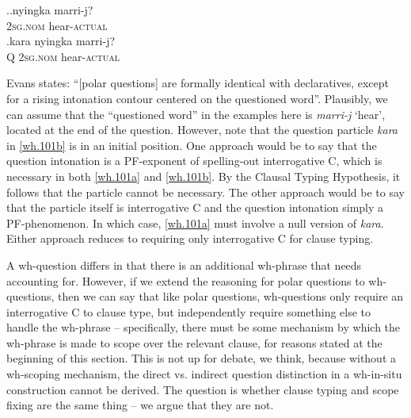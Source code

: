 \documentclass{glossa}
\begin{document}
\ex.\ag.\label{wh.101a}nyingka marri-j?\\
   \textsc{2sg.nom} hear-\textsc{actual}\\
   \bg.\label{wh.101b}kara nyingka marri-j?\\
   Q \textsc{2sg.nom} hear-\textsc{actual}\\
   \hspace{\fill}\citep[364--365]{evans:1995}

Evans states: ``[polar questions] are formally identical with declaratives, except for a rising intonation contour centered on the questioned word''. Plausibly, we can assume that the ``questioned word'' in the examples here is \textit{marri-j} `hear', located at the end of the question. However, note that the question particle \textit{kara} in \ref{wh.101b} is in an initial position. One approach would be to say that the question intonation is a PF-exponent of spelling-out interrogative C, which is necessary in both \ref{wh.101a} and \ref{wh.101b}. By the Clausal Typing Hypothesis, it follows that the particle cannot be necessary. The other approach would be to say that the particle itself is interrogative C and the question intonation simply a PF-phenomenon. In which case, \ref{wh.101a} must involve a null version of \textit{kara}. Either approach reduces to requiring only interrogative C for clause typing.

A wh-question differs in that there is an additional wh-phrase that needs accounting for. However, if we extend the reasoning for polar questions to wh-questions, then we can say that like polar questions, wh-questions only require an interrogative C to clause type, but independently require something else to handle the wh-phrase -- specifically, there must be some mechanism by which the wh-phrase is made to scope over the relevant clause, for reasons stated at the beginning of this section. This is not up for debate, we think, because without a wh-scoping mechanism, the direct vs. indirect question distinction in a wh-in-situ construction cannot be derived. The question is whether clause typing and scope fixing are the same thing -- we argue that they are not.
\end{document}
